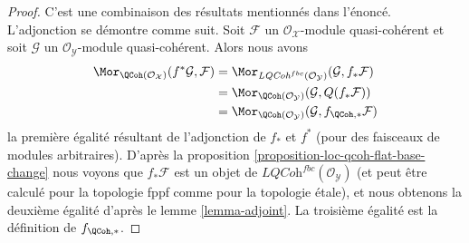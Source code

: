 \begin{proof}
C'est une combinaison des résultats mentionnés dans l'énoncé.
L'adjonction se démontre comme suit. Soit $\mathcal{F}$
un $\mathcal{O}_\mathcal{X}$-module quasi-cohérent et soit
$\mathcal{G}$ un $\mathcal{O}_\mathcal{Y}$-module quasi-cohérent.
Alors nous avons
\begin{align*}
\Mor_{\QCoh(\mathcal{O}_\mathcal{X})}(f^*\mathcal{G}, \mathcal{F})
& =
\Mor_{\textit{LQCoh}^{fbc}(\mathcal{O}_\mathcal{Y})}
(\mathcal{G}, f_*\mathcal{F}) \\
& =
\Mor_{\QCoh(\mathcal{O}_\mathcal{Y})}(\mathcal{G}, Q(f_*\mathcal{F}))
\\
& =
\Mor_{\QCoh(\mathcal{O}_\mathcal{Y})}(\mathcal{G},
f_{\QCoh, *}\mathcal{F})
\end{align*}
la première égalité résultant de l'adjonction de $f_*$ et $f^*$ (pour des faisceaux
de modules arbitraires). D'après la
proposition \ref{proposition-loc-qcoh-flat-base-change}
nous voyons que $f_*\mathcal{F}$ est un objet de
$\textit{LQCoh}^{fbc}(\mathcal{O}_\mathcal{Y})$
(et peut être calculé pour la topologie fppf comme pour la topologie étale), et nous
obtenons la deuxième égalité d'après le lemme \ref{lemma-adjoint}. La troisième
égalité est la définition de $f_{\QCoh, *}$.


\end{proof}
